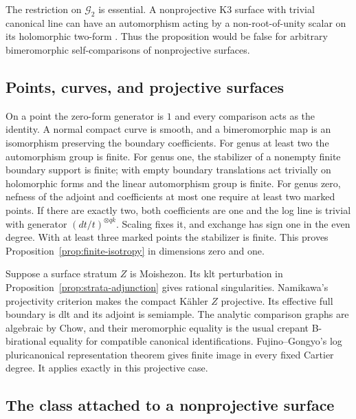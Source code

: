 The restriction on \(\mathcal G_2\) is essential.  A nonprojective K3
surface with trivial canonical line can have an automorphism acting by
a non-root-of-unity scalar on its holomorphic two-form
\cite[Theorems~3.5 and~4.1]{McMullen2002}.  Thus the proposition would be false
for arbitrary bimeromorphic self-comparisons of nonprojective surfaces.

\subsection{Points, curves, and projective surfaces}

On a point the zero-form generator is \(1\) and every comparison acts
as the identity.  A normal compact curve is smooth, and a bimeromorphic
map is an isomorphism preserving the boundary coefficients.  For genus
at least two the automorphism group is finite.  For genus one, the
stabilizer of a nonempty finite boundary support is finite; with empty
boundary translations act trivially on holomorphic forms and the linear
automorphism group is finite.  For genus zero, nefness of the adjoint and
coefficients at most one require at least two marked points.  If there
are exactly two, both coefficients are one and the log line is trivial
with generator \((dt/t)^{\otimes qk}\).  Scaling fixes it, and exchange
has sign one in the even degree.  With at least three marked points the
stabilizer is finite.  This proves Proposition~\ref{prop:finite-isotropy}
in dimensions zero and one.

Suppose a surface stratum \(Z\) is Moishezon.  Its klt perturbation in
Proposition~\ref{prop:strata-adjunction} gives rational singularities.
Namikawa's projectivity criterion \cite[Corollary~6']{Namikawa2002}
makes the compact K\"ahler \(Z\) projective.  Its effective full boundary
is dlt and its adjoint is semiample.  The analytic comparison graphs are
algebraic by Chow, and their meromorphic equality is the usual crepant
B-birational equality for compatible canonical identifications.
Fujino--Gongyo's log pluricanonical representation theorem
\cite[Theorem~1.1]{FujinoGongyo2014} gives finite image in every fixed
Cartier degree.  It applies exactly in this projective case.

\subsection{The class attached to a nonprojective surface}

